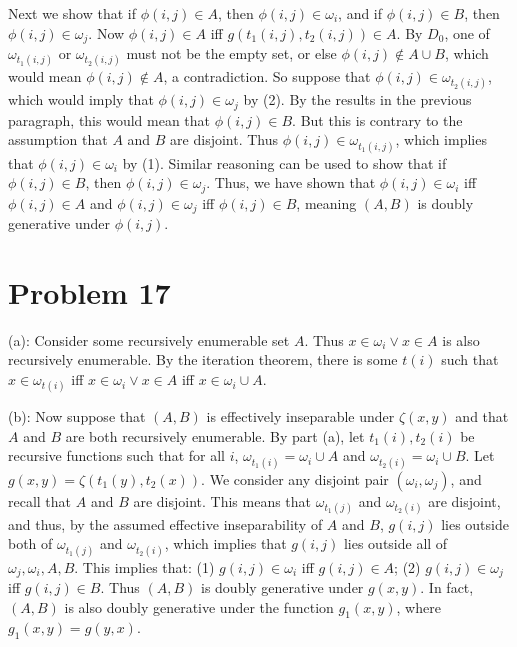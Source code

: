 \documentclass{article}
\theoremstyle{definition}
\begin{document}
Next we show that if $\phi(i,j)\in A$, then $\phi(i,j)\in\omega_i$, and if $\phi(i,j)\in B$, then $\phi(i,j)\in\omega_j$. Now $\phi(i,j)\in A$ iff 
$g(t_1(i,j),t_2(i,j))\in A$. By $D_0$, one of $\omega_{t_1(i,j)}$ or $\omega_{t_2(i,j)}$ must not be the empty set, or else $\phi(i,j)\notin A\cup B$, which would mean 
$\phi(i,j)\notin A$, a contradiction. So suppose that $\phi(i,j)\in\omega_{t_2(i,j)}$, which would imply that $\phi(i,j)\in\omega_j$ by (2). 
By the results in the previous paragraph, this would mean that $\phi(i,j)\in B$. But 
this is contrary to the assumption that $A$ and $B$ are disjoint. Thus $\phi(i,j)\in\omega_{t_1(i,j)}$, which implies that $\phi(i,j)\in\omega_i$ by (1). 
Similar reasoning can be used to show that if $\phi(i,j)\in B$, then 
$\phi(i,j)\in\omega_j$. Thus, we have shown that $\phi(i,j)\in\omega_i$ iff $\phi(i,j)\in A$ and $\phi(i,j)\in\omega_j$ iff $\phi(i,j)\in B$, meaning 
$(A,B)$ is doubly generative under $\phi(i,j)$.

\section*{Problem 17}
(a): Consider some recursively enumerable set $A$. Thus $x\in\omega_i\vee x\in A$ is also recursively enumerable. By the iteration theorem, there is some $t(i)$ such that 
$x\in\omega_{t(i)}$ iff $x\in\omega_i\vee x\in A$ iff $x\in\omega_i\cup A$.


(b): Now suppose that $(A,B)$ is effectively inseparable under $\zeta(x,y)$ and that $A$ and $B$ are both recursively enumerable. By part (a), let $t_1(i),t_2(i)$ be recursive functions such 
that for all $i$, $\omega_{t_1(i)}=\omega_i\cup A$ and $\omega_{t_2(i)}=\omega_i\cup B$. Let $g(x,y)=\zeta(t_1(y),t_2(x))$. 
We consider any disjoint pair $(\omega_i,\omega_j)$, and recall 
that $A$ and $B$ are disjoint. This means that $\omega_{t_1(j)}$ and $\omega_{t_2(i)}$ are disjoint, and thus, by the assumed effective inseparability of $A$ and $B$, 
$g(i,j)$ lies outside both of $\omega_{t_1(j)}$ and $\omega_{t_2(i)}$, which implies that $g(i,j)$ lies outside all of $\omega_j,\omega_i,A,B$.
This implies that:\newline
(1) $g(i,j)\in\omega_i$ iff $g(i,j)\in A$;\newline
(2) $g(i,j)\in\omega_j$ iff $g(i,j)\in B$.\newline
Thus $(A,B)$ is doubly generative under $g(x,y)$. In fact, $(A,B)$ is also doubly generative under the function $g_1(x,y)$, where $g_1(x,y)=g(y,x)$.
\end{document}
